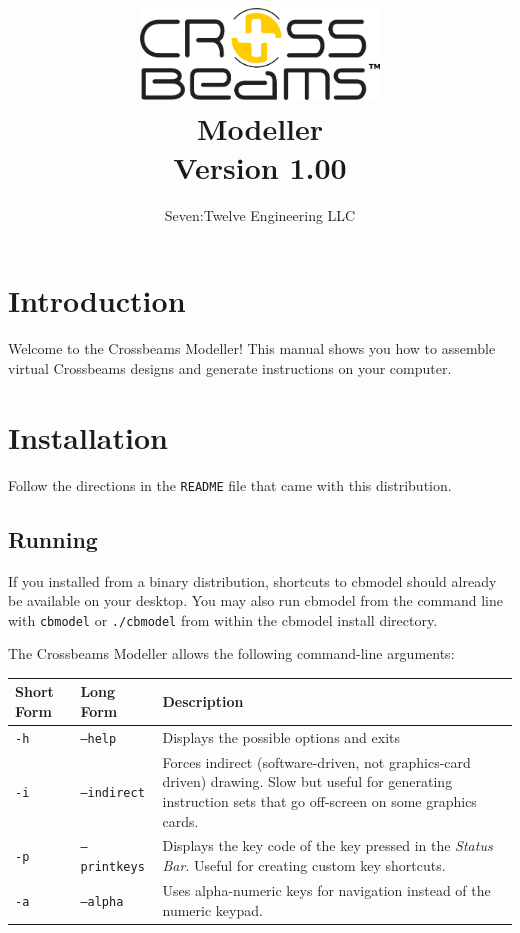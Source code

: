 \documentclass[12pt]{report}
\begin{document}

\title{\includegraphics[width=2.5in]{logo_black.png}\\\vspace{0.5in}Modeller\\Version 1.00}
\author{Seven:Twelve Engineering LLC}
\date{}
\maketitle

\clearpage

\section{Introduction}

Welcome to the Crossbeams Modeller!  This manual shows you how to
assemble virtual Crossbeams designs and generate instructions on your
computer.

\section{Installation}

Follow the directions in the {\tt README} file that came with this
distribution.

\subsection{Running}

If you installed from a binary distribution, shortcuts to cbmodel
should already be available on your desktop.  You may also run cbmodel
from the command line with {\tt cbmodel} or {\tt ./cbmodel} from
within the cbmodel install directory.

The Crossbeams Modeller allows the following command-line arguments:

\begin{center}
\begin{tabular}{llp{3in}}
Short Form & Long Form & Description\\
\hline
{\tt -h} & {\tt --help} & Displays the possible options and exits\\
{\tt -i} & {\tt --indirect} & Forces indirect (software-driven, not graphics-card driven) drawing.  Slow but useful for generating instruction sets that go off-screen on some graphics cards.\\
{\tt -p} & {\tt --printkeys} & Displays the key code of the key pressed in the \emph{Status Bar}.  Useful for creating custom key shortcuts.\\
{\tt -a} & {\tt --alpha} & Uses alpha-numeric keys for navigation instead of the numeric keypad.
\end{tabular}
\end{center}
\end{document}

